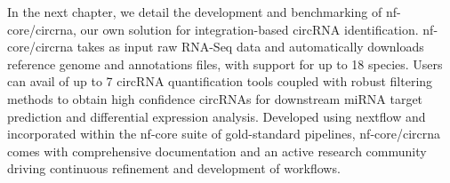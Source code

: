 In the next chapter, we detail the development and benchmarking of nf-core/circrna, our own solution for integration-based circRNA identification. nf-core/circrna takes as input raw RNA-Seq data and automatically downloads reference genome and annotations files, with support for up to 18 species. Users can avail of up to 7 circRNA quantification tools coupled with robust filtering methods to obtain high confidence circRNAs for downstream miRNA target prediction and differential expression analysis. Developed using nextflow and incorporated within the nf-core suite of gold-standard pipelines, nf-core/circrna comes with comprehensive documentation and an active research community driving continuous refinement and development of workflows. 